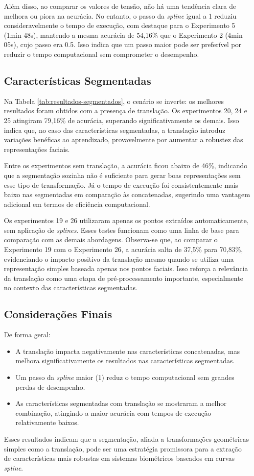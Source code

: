 Além disso, ao comparar os valores de tensão, não há uma tendência clara de melhora ou piora na acurácia. No entanto, o passo da \textit{spline} igual a 1 reduziu consideravelmente o tempo de execução, com destaque para o Experimento 5 (1min 48s), mantendo a mesma acurácia de 54,16\% que o Experimento 2 (4min 05s), cujo passo era 0.5. Isso indica que um passo maior pode ser preferível por reduzir o tempo computacional sem comprometer o desempenho.

\subsection{Características Segmentadas}

Na Tabela \ref{tab:resultados-segmentados}, o cenário se inverte: os melhores resultados foram obtidos com a presença de translação. Os experimentos 20, 24 e 25 atingiram 79,16\% de acurácia, superando significativamente os demais. Isso indica que, no caso das características segmentadas, a translação introduz variações benéficas ao aprendizado, provavelmente por aumentar a robustez das representações faciais.

Entre os experimentos sem translação, a acurácia ficou abaixo de 46\%, indicando que a segmentação sozinha não é suficiente para gerar boas representações sem esse tipo de transformação. Já o tempo de execução foi consistentemente mais baixo nas segmentadas em comparação às concatenadas, sugerindo uma vantagem adicional em termos de eficiência computacional.

Os experimentos 19 e 26 utilizaram apenas os pontos extraídos automaticamente, sem aplicação de \textit{splines}. Esses testes funcionam como uma linha de base para comparação com as demais abordagens. Observa-se que, ao comparar o Experimento 19 com o Experimento 26, a acurácia salta de 37,5\% para 70,83\%, evidenciando o impacto positivo da translação mesmo quando se utiliza uma representação simples baseada apenas nos pontos faciais. Isso reforça a relevância da translação como uma etapa de pré-processamento importante, especialmente no contexto das características segmentadas.

\subsection{Considerações Finais}

De forma geral:
\begin{itemize}
    \item A translação impacta negativamente nas características concatenadas, mas melhora significativamente os resultados nas características segmentadas.
    \item Um passo da \textit{spline} maior (1) reduz o tempo computacional sem grandes perdas de desempenho.
    \item As características segmentadas com translação se mostraram a melhor combinação, atingindo a maior acurácia com tempos de execução relativamente baixos.
\end{itemize}

Esses resultados indicam que a segmentação, aliada a transformações geométricas simples como a translação, pode ser uma estratégia promissora para a extração de características mais robustas em sistemas biométricos baseados em curvas \textit{spline}.